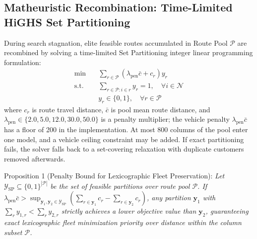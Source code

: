 \documentclass{ieeeaccess}
\begin{document}
\subsection{Matheuristic Recombination: Time-Limited HiGHS Set Partitioning}
\label{sec:set_partitioning}

During search stagnation, elite feasible routes accumulated in Route Pool $\mathcal{P}$ are recombined by solving a time-limited Set Partitioning integer linear programming formulation:
\begin{align}
  \min \quad &\sum_{r \in \mathcal{P}} \left( \lambda_{\text{pen}} \bar{c} + c_r \right) y_r \label{eq:sp_obj} \\
  \text{s.t.} \quad &\sum_{r \in \mathcal{P} : i \in r} y_r = 1, \quad \forall i \in \mathcal{N} \label{eq:sp_cover} \\
  &y_r \in \{0, 1\}, \quad \forall r \in \mathcal{P} \label{eq:sp_binary}
\end{align}
where $c_r$ is route travel distance, $\bar{c}$ is pool mean route distance, and $\lambda_{\text{pen}} \in \{2.0, 5.0, 12.0, 30.0, 50.0\}$ is a penalty multiplier; the vehicle penalty $\lambda_{\text{pen}}\bar{c}$ has a floor of 200 in the implementation. At most 800 columns of the pool enter one model, and a vehicle ceiling constraint may be added. If exact partitioning fails, the solver falls back to a set-covering relaxation with duplicate customers removed afterwards.

\vspace{1mm}
\noindent Proposition 1 (Penalty Bound for Lexicographic Fleet Preservation): \textit{Let $\mathcal{Y}_{\text{SP}} \subseteq \{0, 1\}^{|\mathcal{P}|}$ be the set of feasible partitions over route pool $\mathcal{P}$. If $\lambda_{\text{pen}} \bar{c} > \sup_{\mathbf{y}_1, \mathbf{y}_2 \in \mathcal{Y}_{\text{SP}}} \left( \sum_{r \in \mathbf{y}_1} c_r - \sum_{r \in \mathbf{y}_2} c_r \right)$, any partition $\mathbf{y}_1$ with $\sum_{r} y_{1, r} < \sum_{r} y_{2, r}$ strictly achieves a lower objective value than $\mathbf{y}_2$, guaranteeing exact lexicographic fleet minimization priority over distance within the column subset $\mathcal{P}$.}
\vspace{1mm}
\end{document}
